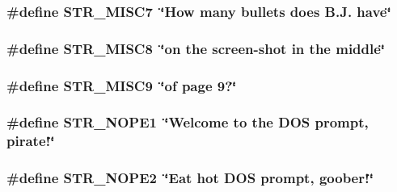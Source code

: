 \label{F__SPEAR_8H_af83844b6869c692c98993da5523494c4}
\hypertarget{F__SPEAR_8H_a90b0445bc75514c683c6809eae789bde}{
\subsubsection[{STR\_\-MISC7}]{\setlength{\rightskip}{0pt plus 5cm}\#define STR\_\-MISC7~\char`\"{}How many bullets does B.J. have\char`\"{}}}
\label{F__SPEAR_8H_a90b0445bc75514c683c6809eae789bde}
\hypertarget{F__SPEAR_8H_a4677fb042211782a8779029ba95e5c1a}{
\subsubsection[{STR\_\-MISC8}]{\setlength{\rightskip}{0pt plus 5cm}\#define STR\_\-MISC8~\char`\"{}on the screen-\/shot in the middle\char`\"{}}}
\label{F__SPEAR_8H_a4677fb042211782a8779029ba95e5c1a}
\hypertarget{F__SPEAR_8H_aa29636566bc0856ced20ffa00608e4e7}{
\subsubsection[{STR\_\-MISC9}]{\setlength{\rightskip}{0pt plus 5cm}\#define STR\_\-MISC9~\char`\"{}of page 9?\char`\"{}}}
\label{F__SPEAR_8H_aa29636566bc0856ced20ffa00608e4e7}
\hypertarget{F__SPEAR_8H_aa71fcd73ea18c3b3adfa37366b46cb09}{
\subsubsection[{STR\_\-NOPE1}]{\setlength{\rightskip}{0pt plus 5cm}\#define STR\_\-NOPE1~\char`\"{}Welcome to the DOS prompt, pirate!\char`\"{}}}
\label{F__SPEAR_8H_aa71fcd73ea18c3b3adfa37366b46cb09}
\hypertarget{F__SPEAR_8H_ae64af068db402eea930d2e29f0b69d51}{
\subsubsection[{STR\_\-NOPE2}]{\setlength{\rightskip}{0pt plus 5cm}\#define STR\_\-NOPE2~\char`\"{}Eat hot DOS prompt, goober!\char`\"{}}}

